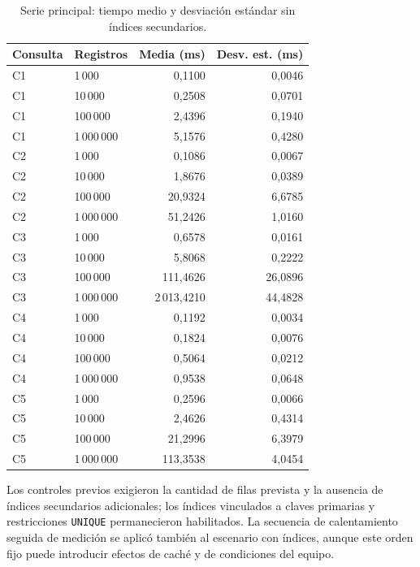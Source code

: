 \documentclass[12pt,a4paper]{article}
\begin{document}
\begin{table}[H]
\centering\small
\setlength{\tabcolsep}{9pt}
\renewcommand{\arraystretch}{1.06}
\begin{tabular}{llrr}
\toprule
\textbf{Consulta} & \textbf{Registros} & \textbf{Media (ms)} & \textbf{Desv. est. (ms)} \\
\midrule
C1 & 1\,000 & 0,1100 & 0,0046 \\
C1 & 10\,000 & 0,2508 & 0,0701 \\
C1 & 100\,000 & 2,4396 & 0,1940 \\
C1 & 1\,000\,000 & 5,1576 & 0,4280 \\
\midrule
C2 & 1\,000 & 0,1086 & 0,0067 \\
C2 & 10\,000 & 1,8676 & 0,0389 \\
C2 & 100\,000 & 20,9324 & 6,6785 \\
C2 & 1\,000\,000 & 51,2426 & 1,0160 \\
\midrule
C3 & 1\,000 & 0,6578 & 0,0161 \\
C3 & 10\,000 & 5,8068 & 0,2222 \\
C3 & 100\,000 & 111,4626 & 26,0896 \\
C3 & 1\,000\,000 & 2\,013,4210 & 44,4828 \\
\midrule
C4 & 1\,000 & 0,1192 & 0,0034 \\
C4 & 10\,000 & 0,1824 & 0,0076 \\
C4 & 100\,000 & 0,5064 & 0,0212 \\
C4 & 1\,000\,000 & 0,9538 & 0,0648 \\
\midrule
C5 & 1\,000 & 0,2596 & 0,0066 \\
C5 & 10\,000 & 2,4626 & 0,4314 \\
C5 & 100\,000 & 21,2996 & 6,3979 \\
C5 & 1\,000\,000 & 113,3538 & 4,0454 \\
\bottomrule
\end{tabular}

\caption{Serie principal: tiempo medio y desviación estándar sin índices secundarios.}
\label{tab:55-serie-sin-indices}
\end{table}

Los controles previos exigieron la cantidad de filas prevista y la
ausencia de índices secundarios adicionales; los índices vinculados
a claves primarias y restricciones \texttt{UNIQUE} permanecieron
habilitados. La secuencia de calentamiento seguida de medición se
aplicó también al escenario con índices, aunque este orden fijo puede
introducir efectos de caché y de condiciones del equipo.
\end{document}
